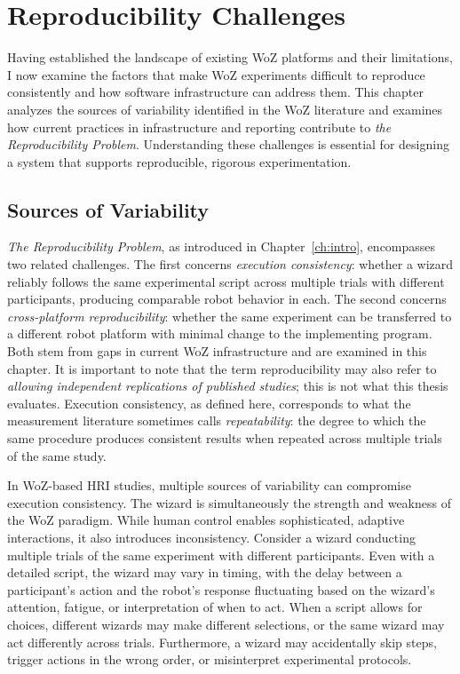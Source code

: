 \chapter{Reproducibility Challenges}
\label{ch:reproducibility}

Having established the landscape of existing WoZ platforms and their limitations, I now examine the factors that make WoZ experiments difficult to reproduce consistently and how software infrastructure can address them. This chapter analyzes the sources of variability identified in the WoZ literature and examines how current practices in infrastructure and reporting contribute to \emph{the Reproducibility Problem}. Understanding these challenges is essential for designing a system that supports reproducible, rigorous experimentation.

\section{Sources of Variability}

\emph{The Reproducibility Problem}, as introduced in Chapter~\ref{ch:intro}, encompasses two related challenges. The first concerns \emph{execution consistency}: whether a wizard reliably follows the same experimental script across multiple trials with different participants, producing comparable robot behavior in each. The second concerns \emph{cross-platform reproducibility}: whether the same experiment can be transferred to a different robot platform with minimal change to the implementing program. Both stem from gaps in current WoZ infrastructure and are examined in this chapter. It is important to note that the term reproducibility may also refer to \emph{allowing independent replications of published studies}; this is not what this thesis evaluates. Execution consistency, as defined here, corresponds to what the measurement literature sometimes calls \emph{repeatability}: the degree to which the same procedure produces consistent results when repeated across multiple trials of the same study.

In WoZ-based HRI studies, multiple sources of variability can compromise execution consistency. The wizard is simultaneously the strength and weakness of the WoZ paradigm. While human control enables sophisticated, adaptive interactions, it also introduces inconsistency. Consider a wizard conducting multiple trials of the same experiment with different participants.
 Even with a detailed script, the wizard may vary in timing, with the delay between a participant's action and the robot's response fluctuating based on the wizard's attention, fatigue, or interpretation of when to act. When a script allows for choices, different wizards may make different selections, or the same wizard may act differently across trials. Furthermore, a wizard may accidentally skip steps, trigger actions in the wrong order, or misinterpret experimental protocols.

